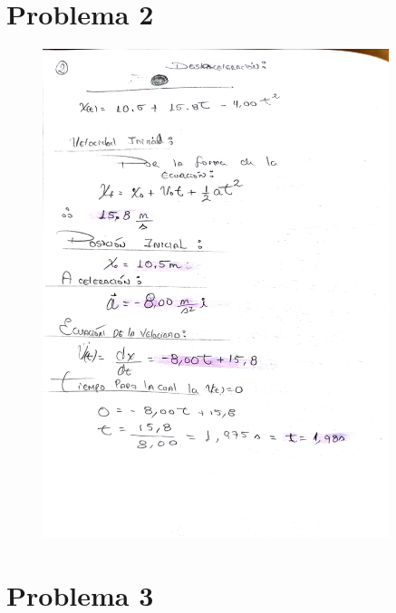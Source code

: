 \documentclass{article}
\begin{document}
\newpage

\section{Problema 2}

\begin{figure}[ht!]
  \centering
  \includegraphics[width=0.9\textwidth]{assets/2.jpg}
  \label{fig:example_image2}
\end{figure}

\section{Problema 3}
\end{document}
